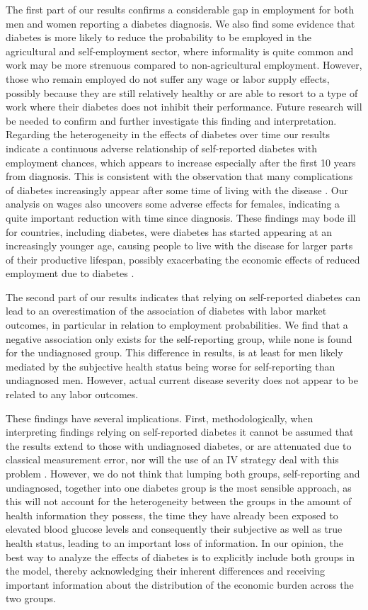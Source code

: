 \documentclass[12pt,english]{article}
\begin{document}
The first part of our results confirms a considerable gap in employment for both men and women reporting a diabetes diagnosis. We also find some evidence that diabetes is more likely to reduce the probability to be employed in the agricultural and self-employment sector, where informality is quite common and work may be more strenuous compared to non-agricultural employment. However, those who remain employed do not suffer any wage or labor supply effects, possibly because they are still relatively healthy or are able to resort to a type of work where their diabetes does not inhibit their performance. Future research will be needed to confirm and further investigate this finding and interpretation. Regarding the heterogeneity in the effects of diabetes over time our results indicate a continuous adverse relationship of self-reported diabetes with employment chances, which appears to increase especially after the first 10 years from diagnosis. This is consistent with the observation that many complications of diabetes increasingly appear after some time of living with the disease \parencite{Adler2003}. Our analysis on wages also uncovers some adverse effects for females, indicating a quite important reduction with time since diagnosis. These findings may bode ill for countries, including diabetes, were diabetes has started appearing at an increasingly younger age, causing people to live with the disease for larger parts of their productive lifespan, possibly exacerbating the economic effects of reduced employment due to diabetes \parencite{Hu2011,Villalpando2010}.

The second part of our results indicates that relying on self-reported diabetes can lead to an overestimation of the association of diabetes with labor market outcomes, in particular in relation to employment probabilities. We find that a negative association only exists for the self-reporting group, while none is found for the undiagnosed group. This difference in results, is at least for men likely mediated by the subjective health status being worse for self-reporting than undiagnosed men. However, actual current disease severity does not appear to be related to any labor outcomes.

These findings have several implications. First, methodologically, when interpreting findings relying on self-reported diabetes it cannot be assumed that the results extend to those with undiagnosed diabetes, or are attenuated due to classical measurement error, nor will the use of an \ac{IV} strategy deal with this problem \parencite{Cawley2015}. However, we do not think that lumping both groups, self-reporting and undiagnosed, together into one diabetes group is the most sensible approach, as this will not account for the heterogeneity between the groups in the amount of health information they possess, the time they have already been exposed to elevated blood glucose levels and consequently their subjective as well as true health status, leading to an important loss of information. In our opinion, the best way to analyze the effects of diabetes is to explicitly include both groups in the model, thereby acknowledging their inherent differences and receiving important information about the distribution of the economic burden across the two groups. 
\end{document}

